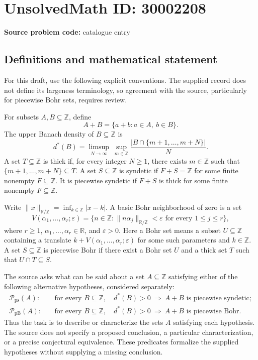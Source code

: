 \documentclass[11pt]{article}
\newcommand{\Z}{\mathbb{Z}}
\newcommand{\R}{\mathbb{R}}
\begin{document}
\section*{UnsolvedMath ID: 30002208}
\textbf{Source problem code:} catalogue entry
\subsection{Definitions and mathematical statement}
For this draft, use the following explicit conventions. The supplied record does not define its largeness terminology, so agreement with the source, particularly for piecewise Bohr sets, requires review.

For subsets \(A,B\subseteq\Z\), define
\[
A+B=\{a+b:a\in A,\ b\in B\}.
\]
The upper Banach density of \(B\subseteq\Z\) is
\[
d^*(B)=\limsup_{N\to\infty}\ \sup_{m\in\Z}
\frac{\lvert B\cap\{m+1,\ldots,m+N\}\rvert}{N}.
\]
A set \(T\subseteq\Z\) is thick if, for every integer \(N\geq1\), there exists \(m\in\Z\) such that \(\{m+1,\ldots,m+N\}\subseteq T\). A set \(S\subseteq\Z\) is syndetic if \(F+S=\Z\) for some finite nonempty \(F\subseteq\Z\). It is piecewise syndetic if \(F+S\) is thick for some finite nonempty \(F\subseteq\Z\).

Write \(\lVert x\rVert_{\R/\Z}=\inf_{k\in\Z}|x-k|\). A basic Bohr neighborhood of zero is a set
\[
V(\alpha_1,\ldots,\alpha_r;\varepsilon)
=\{n\in\Z:\lVert n\alpha_j\rVert_{\R/\Z}<\varepsilon\text{ for every }1\leq j\leq r\},
\]
where \(r\geq1\), \(\alpha_1,\ldots,\alpha_r\in\R\), and \(\varepsilon>0\). Here a Bohr set means a subset \(U\subseteq\Z\) containing a translate \(k+V(\alpha_1,\ldots,\alpha_r;\varepsilon)\) for some such parameters and \(k\in\Z\). A set \(S\subseteq\Z\) is piecewise Bohr if there exist a Bohr set \(U\) and a thick set \(T\) such that \(U\cap T\subseteq S\).

The source asks what can be said about a set \(A\subseteq\Z\) satisfying either of the following alternative hypotheses, considered separately:
\[
\begin{aligned}
\mathcal P_{\mathrm{ps}}(A):\quad&
\text{for every }B\subseteq\Z,\quad
 d^*(B)>0\ \Longrightarrow\ A+B\text{ is piecewise syndetic};\\
\mathcal P_{\mathrm{pB}}(A):\quad&
\text{for every }B\subseteq\Z,\quad
 d^*(B)>0\ \Longrightarrow\ A+B\text{ is piecewise Bohr}.
\end{aligned}
\]
Thus the task is to describe or characterize the sets \(A\) satisfying each hypothesis. The source does not specify a proposed conclusion, a particular characterization, or a precise conjectural equivalence. These predicates formalize the supplied hypotheses without supplying a missing conclusion.
\end{document}
